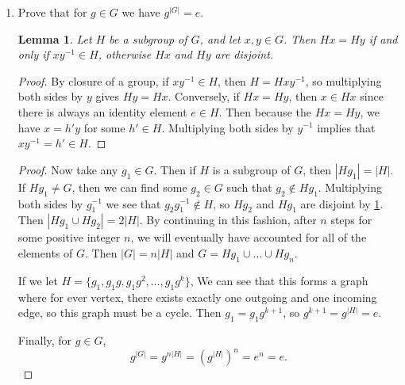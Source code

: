 \documentclass{article}
\newtheorem{lemma}[theorem]{Lemma}
\begin{document}
\begin{enumerate}[label=(\alph*)]
\begin{proof}
    \end{proof}
    \item Prove that for $g \in G$ we have $g^{|G|}=e$.
    \begin{lemma}\label{5.1}
    Let $H$ be a subgroup of $G$, and let $x,y\in G$. Then $Hx=Hy$ if and only if $xy^{-1}\in H$, otherwise $Hx$ and $Hy$ are disjoint.
    \end{lemma}
    \begin{proof}
    By closure of a group, if $xy^{-1}\in H$, then $H=Hxy^{-1}$, so multiplying both sides by $y$ gives $Hy=Hx$. Conversely, if $Hx=Hy$, then $x\in Hx$ since there is always an identity element $e\in H$. Then because the $Hx=Hy$, we have $x=h'y$ for some $h'\in H$. Multiplying both sides by $y^{-1}$ implies that $xy^{-1}=h'\in H$.
    \end{proof}
    \begin{proof}
    Now take any $g_1\in G$. Then if $H$ is a subgroup of $G$, then $|Hg_1|=|H|$. If $Hg_1\neq G$, then we can find some $g_2\in G$ such that $g_2 \notin Hg_1$. Multiplying both sides by $g_1^{-1}$ we see that $g_2g_1^{-1} \notin H$, so $Hg_2$ and $Hg_1$ are disjoint by \ref{5.1}. Then $|Hg_1 \cup Hg_2| = 2|H|$. By continuing in this fashion, after $n$ steps for some positive integer $n$, we will eventually have accounted for all of the elements of $G$. Then $|G| = n|H|$ and $G = Hg_1 \cup ... \cup Hg_n$. 
    \par If we let $H=\{g_1, g_1g, g_1g^2, \dots, g_1g^k\}$, We can see that this forms a graph where for ever vertex, there exists exactly one outgoing and one incoming edge, so this graph must be a cycle. Then $g_1=g_1g^{k+1}$, so $g^{k+1}=g^{|H|}=e$.
    \par Finally, for $g\in G$,
    \[g^{|G|}=g^{n|H|}=(g^{|H|})^{n}=e^{n}=e.\]
    \end{proof}
\end{enumerate}
\end{document}
